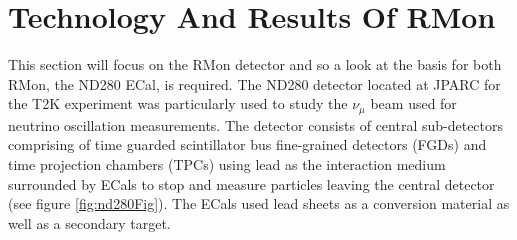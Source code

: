 \section{Technology And Results Of RMon}
This section will focus on the RMon detector and so a look at the basis for both RMon, the ND280 ECal, is required. The ND280 detector located at JPARC for the T2K experiment was particularly used to study the $\nu_\mu$ beam used for neutrino oscillation measurements. The detector consists of central sub-detectors comprising of time guarded scintillator bus fine-grained detectors (FGDs) and time projection chambers (TPCs) using lead as the interaction medium surrounded by ECals to stop and measure particles leaving the central detector (see figure \ref{fig:nd280Fig}). The ECals used lead sheets as a conversion material as well as a secondary target. 

